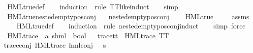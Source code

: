 \begin{isabellebody}
\ HML{\isacharunderscore}{\kern0pt}true{\isacharunderscore}{\kern0pt}def\isanewline
\ \ \isamarkupfalse%
\ {\isacharparenleft}{\kern0pt}induction\ {\isasymphi}\ rule{\isacharcolon}{\kern0pt}\ TT{\isacharunderscore}{\kern0pt}like{\isachardot}{\kern0pt}induct{\isacharparenright}{\kern0pt}\isanewline
\ \ \isamarkupfalse%
\ simp{\isacharplus}{\kern0pt}%
\endisatagproof
{\isafoldproof}%
%
\isadelimproof
\isanewline
%
\endisadelimproof
\isanewline
{}\isamarkupfalse%
\ HML{\isacharunderscore}{\kern0pt}true{\isacharunderscore}{\kern0pt}nested{\isacharunderscore}{\kern0pt}empty{\isacharunderscore}{\kern0pt}pos{\isacharunderscore}{\kern0pt}conj{\isacharcolon}{\kern0pt}\isanewline
\ \ \ {\isachardoublequoteopen}nested{\isacharunderscore}{\kern0pt}empty{\isacharunderscore}{\kern0pt}pos{\isacharunderscore}{\kern0pt}conj\ {\isasymphi}{\isachardoublequoteclose}\isanewline
\ \ \ {\isachardoublequoteopen}HML{\isacharunderscore}{\kern0pt}true\ {\isasymphi}{\isachardoublequoteclose}\isanewline
%
\isadelimproof
\ \ %
\endisadelimproof
%
\isatagproof
{}\isamarkupfalse%
\ assms\isanewline
\ \ \isamarkupfalse%
\ HML{\isacharunderscore}{\kern0pt}true{\isacharunderscore}{\kern0pt}def\isanewline
\ \ \isamarkupfalse%
\ {\isacharparenleft}{\kern0pt}induction\ {\isasymphi}\ rule{\isacharcolon}{\kern0pt}\ nested{\isacharunderscore}{\kern0pt}empty{\isacharunderscore}{\kern0pt}pos{\isacharunderscore}{\kern0pt}conj{\isachardot}{\kern0pt}induct{\isacharparenright}{\kern0pt}\isanewline
\ \ \isamarkupfalse%
\ {\isacharparenleft}{\kern0pt}simp{\isacharcomma}{\kern0pt}\ force{\isacharparenright}{\kern0pt}%
\endisatagproof
{\isafoldproof}%
%
\isadelimproof
\isanewline
%
\endisadelimproof
\isanewline
{}\isamarkupfalse%
\ \isanewline
\isanewline
\isanewline
\isanewline
{}\isamarkupfalse%
\ HML{\isacharunderscore}{\kern0pt}trace\ {\isacharcolon}{\kern0pt}{\isacharcolon}{\kern0pt}\ {\isachardoublequoteopen}{\isacharparenleft}{\kern0pt}{\isacharprime}{\kern0pt}a{\isacharcomma}{\kern0pt}\ {\isacharprime}{\kern0pt}s{\isacharparenright}{\kern0pt}hml\ {\isasymRightarrow}\ bool{\isachardoublequoteclose}\isanewline
\ \ \isanewline
trace{\isacharunderscore}{\kern0pt}tt\ {\isacharcolon}{\kern0pt}\ {\isachardoublequoteopen}HML{\isacharunderscore}{\kern0pt}trace\ TT{\isachardoublequoteclose}\ {\isacharbar}{\kern0pt}\isanewline
trace{\isacharunderscore}{\kern0pt}conj{\isacharcolon}{\kern0pt}\ {\isachardoublequoteopen}HML{\isacharunderscore}{\kern0pt}trace\ {\isacharparenleft}{\kern0pt}hml{\isacharunderscore}{\kern0pt}conj\ {\isacharbraceleft}{\kern0pt}{\isacharbraceright}{\kern0pt}\ {\isacharbraceleft}{\kern0pt}{\isacharbraceright}{\kern0pt}\ {\isasympsi}s{\isacharparenright}{\kern0pt}{\isachardoublequoteclose}{\isacharbar}{\kern0pt}\isanewline

\end{isabellebody}
